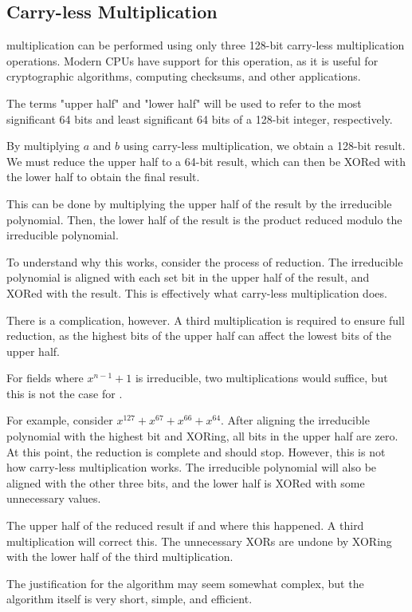 \subsection{Carry-less Multiplication}

 multiplication can be performed using only three 128-bit carry-less multiplication operations.
Modern CPUs have support for this operation, as it is useful for cryptographic algorithms, computing checksums, and other applications. \cite{intel-clmul}

The terms "upper half" and "lower half" will be used to refer to the most significant 64 bits and least significant 64 bits of a 128-bit integer, respectively.

By multiplying $a$ and $b$ using carry-less multiplication, we obtain a 128-bit result.
We must reduce the upper half to a 64-bit result, which can then be XORed with the lower half to obtain the final result.

This can be done by multiplying the upper half of the result by the irreducible polynomial.
Then, the lower half of the result is the product reduced modulo the irreducible polynomial.

To understand why this works, consider the process of reduction.
The irreducible polynomial is aligned with each set bit in the upper half of the result, and XORed with the result.
This is effectively what carry-less multiplication does.

There is a complication, however.
A third multiplication is required to ensure full reduction, as the highest bits of the upper half can affect the lowest bits of the upper half.

For fields where $x^{n - 1} + 1$ is irreducible, two multiplications would suffice, but this is not the case for .

For example, consider $x^{127} + x^{67} + x^{66} + x^{64}$.
After aligning the irreducible polynomial with the highest bit and XORing, all bits in the upper half are zero.
At this point, the reduction is complete and should stop.
However, this is not how carry-less multiplication works.
The irreducible polynomial will also be aligned with the other three bits, and the lower half is XORed with some unnecessary values.

The upper half of the reduced result if and where this happened. A third multiplication will correct this.
The unnecessary XORs are undone by XORing with the lower half of the third multiplication.

The justification for the algorithm may seem somewhat complex, but the algorithm itself is very short, simple, and efficient.

